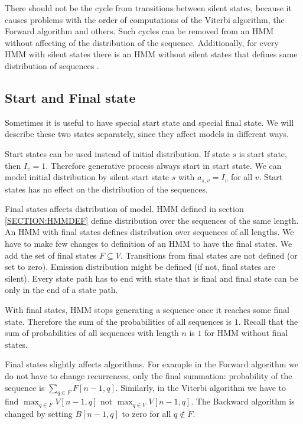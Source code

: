 There should not be the cycle from transitions between silent states, because it
causes problems with the order of computations of the Viterbi algorithm, the
Forward algorithm and others. Such cycles can be removed from an HMM without
affecting of the distribution of the sequence. Additionally, for every HMM with silent
states there is an HMM without silent states that defines same distribution of
sequences \cite{Nanasi2010mgr}.


\subsection{Start and Final state}

Sometimes it is useful to have special start state and special final state. We
will describe these two states separately, since they affect models in different
ways. 

Start states can be used instead of initial distribution. If state $s$ is start
state, then $I_v=1$. Therefore generative process always start in start state.
We can model initial distribution by silent start state $s$ with $a_{s,v}=I_v$
for all $v$. Start states has no effect on the distribution of the sequences.

Final states affects distribution of model. HMM defined in section
\ref{SECTION:HMMDEF} define distribution over the sequences of the same length.
An HMM with
final states defines distribution over sequences of all lengths.  We have to make
few changes to definition of an HMM to have the final states.
We add the set of final states $F\subseteq V$. Transitions from final states are not
defined (or set to zero). Emission distribution might be defined (if not, final
states are silent). Every state path has to end with state that is final and
final state can be only in the end of a state path.

With final states, HMM stops generating a sequence once it reaches some final
state. Therefore the sum of the probabilities of all sequences is $1$. Recall
that the sum of probabilities of all sequences with length $n$ is $1$ for HMM
without final states.

Final states slightly affects algorithms. For example in the Forward algorithm we do
not have to change recurrences, only the final summation: probability of the sequence is $\sum_{q\in F}F[n-1,q]$. 
Similarly, in the Viterbi algorithm
we have to find $\max_{q\in F} V[n-1,q]$ not $\max_{q\in V} V[n-1,q]$. 
The Backward algorithm is changed by setting $B[n-1,q]$ to zero for all $q\notin F$.

